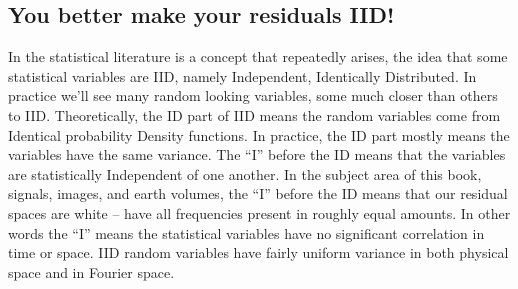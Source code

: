 \subsection{You better make your residuals IID!}
In the statistical literature is a concept that repeatedly arises,
the idea that some statistical variables are IID, namely Independent, Identically Distributed.
In practice we'll see many random looking variables,
some much closer than others to IID.
Theoretically, the ID part of IID means the random variables come from Identical
probability Density functions.
In practice, the ID part mostly means the variables have the same variance.
The ``I'' before the ID means that the variables are statistically Independent of one another.
In the subject area of this book, signals, images, and earth volumes,
the ``I'' before the ID means that our residual spaces are white --
have all frequencies present in roughly equal amounts.
In other words the ``I'' means the statistical variables
have no significant correlation in time or space.
IID random variables have fairly uniform variance in both physical space and in Fourier space.


